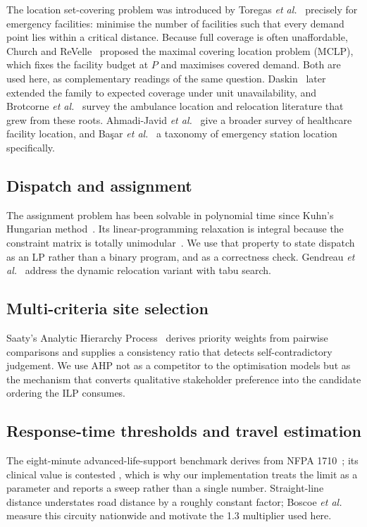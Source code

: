 \documentclass[conference]{IEEEtran}
\begin{document}
The location set-covering problem was introduced by Toregas \textit{et
al.}~\cite{toregas1971} precisely for emergency facilities: minimise the number
of facilities such that every demand point lies within a critical distance.
Because full coverage is often unaffordable, Church and
ReVelle~\cite{church1974} proposed the maximal covering location problem (MCLP),
which fixes the facility budget at $P$ and maximises covered demand. Both are
used here, as complementary readings of the same question. Daskin~\cite{daskin1983}
later extended the family to expected coverage under unit unavailability, and
Brotcorne \textit{et al.}~\cite{brotcorne2003} survey the ambulance location and
relocation literature that grew from these roots. Ahmadi-Javid \textit{et
al.}~\cite{ahmadijavid2017} give a broader survey of healthcare facility
location, and Ba\c{s}ar \textit{et al.}~\cite{basar2012} a taxonomy of emergency
station location specifically.

\subsection{Dispatch and assignment}

The assignment problem has been solvable in polynomial time since
Kuhn's Hungarian method~\cite{kuhn1955}. Its linear-programming relaxation is
integral because the constraint matrix is totally
unimodular~\cite{hoffman1956}. We use that property to state dispatch as an
LP rather than a binary program, and as a correctness check.
Gendreau \textit{et al.}~\cite{gendreau1997} address the dynamic relocation
variant with tabu search.

\subsection{Multi-criteria site selection}

Saaty's Analytic Hierarchy Process~\cite{saaty1977} derives priority weights
from pairwise comparisons and supplies a consistency ratio that detects
self-contradictory judgement. We use AHP not as a competitor to the
optimisation models but as the mechanism that converts qualitative stakeholder
preference into the candidate ordering the ILP consumes.

\subsection{Response-time thresholds and travel estimation}

The eight-minute advanced-life-support benchmark derives from NFPA
1710~\cite{nfpa1710}; its clinical value is contested
\cite{pons2002,blackwell2002}, which is why our implementation treats the limit
as a parameter and reports a sweep rather than a single number. Straight-line
distance understates road distance by a roughly constant factor; Boscoe
\textit{et al.}~\cite{boscoe2012} measure this circuity nationwide and motivate
the 1.3 multiplier used here.
\end{document}

